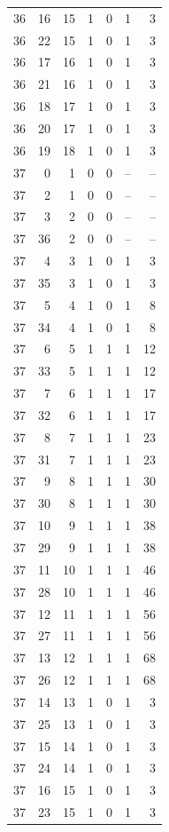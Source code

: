 \begin{longtable}{rrrrrrr}
36 & 16 & 15 & 1 & 0 & 1 & 3\\
36 & 22 & 15 & 1 & 0 & 1 & 3\\
36 & 17 & 16 & 1 & 0 & 1 & 3\\
36 & 21 & 16 & 1 & 0 & 1 & 3\\
36 & 18 & 17 & 1 & 0 & 1 & 3\\
36 & 20 & 17 & 1 & 0 & 1 & 3\\
36 & 19 & 18 & 1 & 0 & 1 & 3\\
37 & 0 & 1 & 0 & 0 & -- & --\\
37 & 2 & 1 & 0 & 0 & -- & --\\
37 & 3 & 2 & 0 & 0 & -- & --\\
37 & 36 & 2 & 0 & 0 & -- & --\\
37 & 4 & 3 & 1 & 0 & 1 & 3\\
37 & 35 & 3 & 1 & 0 & 1 & 3\\
37 & 5 & 4 & 1 & 0 & 1 & 8\\
37 & 34 & 4 & 1 & 0 & 1 & 8\\
37 & 6 & 5 & 1 & 1 & 1 & 12\\
37 & 33 & 5 & 1 & 1 & 1 & 12\\
37 & 7 & 6 & 1 & 1 & 1 & 17\\
37 & 32 & 6 & 1 & 1 & 1 & 17\\
37 & 8 & 7 & 1 & 1 & 1 & 23\\
37 & 31 & 7 & 1 & 1 & 1 & 23\\
37 & 9 & 8 & 1 & 1 & 1 & 30\\
37 & 30 & 8 & 1 & 1 & 1 & 30\\
37 & 10 & 9 & 1 & 1 & 1 & 38\\
37 & 29 & 9 & 1 & 1 & 1 & 38\\
37 & 11 & 10 & 1 & 1 & 1 & 46\\
37 & 28 & 10 & 1 & 1 & 1 & 46\\
37 & 12 & 11 & 1 & 1 & 1 & 56\\
37 & 27 & 11 & 1 & 1 & 1 & 56\\
37 & 13 & 12 & 1 & 1 & 1 & 68\\
37 & 26 & 12 & 1 & 1 & 1 & 68\\
37 & 14 & 13 & 1 & 0 & 1 & 3\\
37 & 25 & 13 & 1 & 0 & 1 & 3\\
37 & 15 & 14 & 1 & 0 & 1 & 3\\
37 & 24 & 14 & 1 & 0 & 1 & 3\\
37 & 16 & 15 & 1 & 0 & 1 & 3\\
37 & 23 & 15 & 1 & 0 & 1 & 3\\

\end{longtable}
